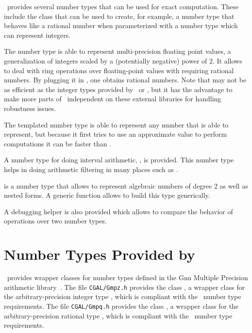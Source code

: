 \cgal\ provides several number types that can be used for 
exact computation.  These include the  class that can
be used to create, for example, a number type that behaves like a rational
number when parameterized with a number type which can represent integers.

The number type  is able to represent multi-precision floating
point values, a generalization of integers scaled by a (potentially negative)
power of 2.  It allows to deal with ring operations over floating-point values
with requiring rational numbers.  By plugging it in , one obtains
rational numbers.  Note that  may not be as efficient as the
integer types provided by \gmp\  or \leda, but it has the advantage
to make more parts of \cgal\ independent on these external libraries for
handling robustness issues.

The templated number type  is able to represent any
number that  is able to represent, but because it first tries to use an
approximate value to perform computations it can be faster than .

A number type for doing interval arithmetic, , is provided.
This number type helps in doing arithmetic filtering in many places such
as .

 is a number type that allows to represent algebraic
numbers of degree 2 as well as nested forms.  A generic function
 allows to build this type generically.

A debugging helper  is also
provided which allows to compare the behavior of operations over two number
types.

\section[Number Types Provided by GMP]{Number Types Provided by \gmp} 
\label{gmp-nt}

\cgal\ provides wrapper classes for number types defined in the {\sc
Gnu} Multiple Precision arithmetic library~\cite{g-ggmpa-}. The file
{\tt  CGAL/Gmpz.h} provides the class , a wrapper class for
the arbitrary-precision integer type , which is compliant
with the \cgal\ number type requirements. The file {\tt  CGAL/Gmpq.h}
provides the class , a wrapper class for the arbitrary-precision
rational type , which is compliant with the \cgal\ number
type requirements.

